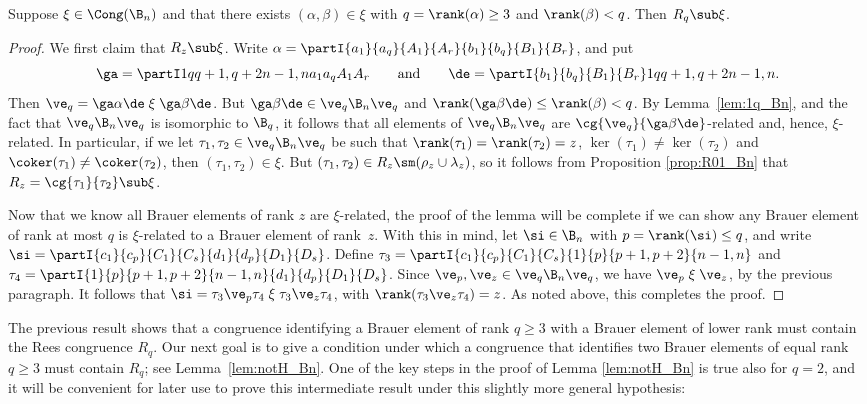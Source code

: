 \begin{lemma}\label{lem:qp_Bn}
Suppose $\xi\in\Cong(\B_n)$ and that there exists $(\alpha,\beta)\in\xi$ with $q=\rank(\alpha)\geq3$ and $\rank(\beta)<q$.  Then $R_q\sub\xi$.
\end{lemma}

\begin{proof}
We first claim that $R_z\sub\xi$.  Write $\alpha=\partI{a_1}{a_q}{A_1}{A_r}{b_1}{b_q}{B_1}{B_r}$, and put
$$\ga=\partI1q{q+1,q+2}{n-1,n}{a_1}{a_q}{A_1}{A_r} \qquad\text{and}\qquad \de=\partI{b_1}{b_q}{B_1}{B_r}1q{q+1,q+2}{n-1,n}.$$
%
Then $\ve_q=\ga\alpha\de\mathrel\xi\ga\beta\de$.  But $\ga\beta\de\in\ve_q\B_n\ve_q$ and ${\rank(\ga\beta\de)\leq\rank(\beta)<q}$.  By Lemma~\ref{lem:1q_Bn}, and the fact that $\ve_q\B_n\ve_q$ is isomorphic to $\B_q$, it follows that all elements of $\ve_q\B_n\ve_q$ are $\cg{\ve_q}{\ga\beta\de}$-related and, hence, $\xi$-related.  In particular, if we let $\tau_1,\tau_2\in\ve_q\B_n\ve_q$ be such that $\rank(\tau_1)=\rank(\tau_2)=z$, $\ker(\tau_1)\not=\ker(\tau_2)$ and $\coker(\tau_1)\not=\coker(\tau_2)$, then $(\tau_1,\tau_2)\in\xi$.  But $(\tau_1,\tau_2)\in R_z\sm(\rho_z\cup\lambda_z)$, so it follows from Proposition \ref{prop:R01_Bn} that $R_z=\cg{\tau_1}{\tau_2}\sub\xi$.

Now that we know all Brauer elements of rank $z$ are $\xi$-related, the proof of the lemma will be complete if we can show any Brauer element of rank at most $q$ is $\xi$-related to a Brauer element of rank~$z$.  With this in mind, let $\si\in\B_n$ with $p=\rank(\si)\leq q$, and write $\si=\partI{c_1}{c_p}{C_1}{C_s}{d_1}{d_p}{D_1}{D_s}$.  Define ${\tau_3=\partI{c_1}{c_p}{C_1}{C_s}{1}{p}{p+1,p+2}{n-1,n}}$ and $\tau_4=\partI{1}{p}{p+1,p+2}{n-1,n}{d_1}{d_p}{D_1}{D_s}$.  Since $\ve_p,\ve_z\in\ve_q\B_n\ve_q$, we have $\ve_p \mathrel\xi \ve_z$, by the previous paragraph.  It follows that $\si = \tau_3\ve_p\tau_4 \mathrel\xi \tau_3\ve_z\tau_4$, with $\rank(\tau_3\ve_z\tau_4)=z$.  As noted above, this completes the proof. \end{proof}

The previous result shows that a congruence identifying a Brauer element of rank $q\geq3$ with a Brauer element of lower rank must contain the Rees congruence $R_q$.
%
Our next goal is to give a condition under which a congruence that identifies two Brauer elements of equal rank $q\geq3$ must contain $R_q$; see Lemma~\ref{lem:notH_Bn}.
%
One of the key steps in the proof of Lemma \ref{lem:notH_Bn} is true also for $q=2$, and it will be convenient for later use to prove this intermediate result under this slightly more general hypothesis:



